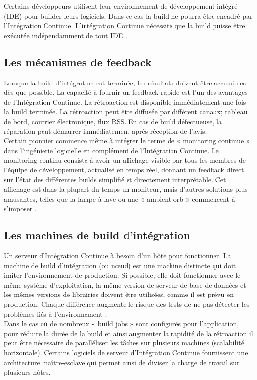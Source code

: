     Certains développeurs utilisent leur environnement de développement intégré (IDE) pour builder leurs logiciels. Dans ce cas la build ne pourra être encadré par l’Intégration Continue. L’intégration Continue nécessite que la build puisse être exécutée indépendamment de tout IDE \cite{Duv07}.

    \subsection{Les mécanismes de feedback}
    Lorsque la build d'intégration est terminée, les résultats doivent être accessibles dès que possible. La capacité à fournir un feedback rapide est l'un des avantages de l’Intégration Continue. La rétroaction est disponible immédiatement une fois la build terminée. La rétroaction peut être diffusée par différent canaux; tableau de bord, courrier électronique, flux RSS. En cas de build défectueuse, la réparation peut démarrer immédiatement après réception de l'avis.\\

    Certain pionnier commence même à intégrer le terme de « monitoring continue » dans l’ingénierie logicielle en complément de l’Intégration Continue. Le monitoring continu consiste à avoir un affichage visible par tous les membres de l’équipe de développement, actualisé en temps réel, donnant un feedback direct sur l’état des différentes builds simplifié et directement interprétable. Cet affichage est dans la plupart du temps un moniteur, mais d’autres solutions plus amusantes, telles que la lampe à lave ou une « ambient orb » commencent à s’imposer \cite{Swa04}.

    \subsection{Les machines de build d’intégration}
    Un serveur d’Intégration Continue à besoin d'un hôte pour fonctionner. La machine de build d’intégration (ou nœud) est une machine distincte qui doit imiter l'environnement de production. Si possible, elle doit fonctionner avec le même système d'exploitation, la même version de serveur de base de données et les mêmes versions de librairies doivent être utilisées, comme il est prévu en production. Chaque différence augmente le risque des tests de ne pas détecter les problèmes liés à l’environnement \cite{Fow06}.\\

    Dans le cas où de nombreux « build jobs » sont configurés pour l’application, pour réduire la durée de la build et ainsi augmenter la rapidité de la rétroaction il peut être nécessaire de paralléliser les tâches sur plusieurs machines (scalabilité horizontale). Certains logiciels de serveur d’Intégration Continue fournissent une architecture maître-esclave qui permet ainsi de diviser la charge de travail sur plusieurs hôtes.\\


